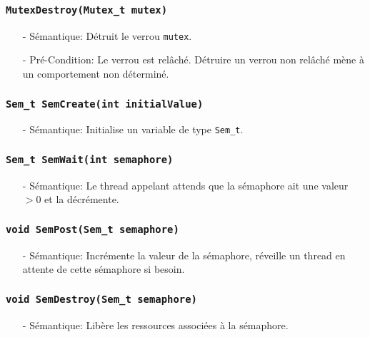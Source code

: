 \documentclass[11pt]{article}
\begin{document}
\subsubsection{\texttt{MutexDestroy(Mutex\_t mutex)}}
\begin{itemize}
\item[-]Sémantique: Détruit le verrou \texttt{mutex}.
\item[-]Pré-Condition: Le verrou est relâché. Détruire un verrou non relâché mène à un comportement
  non déterminé.
\end{itemize}

\subsubsection{\texttt{Sem\_t SemCreate(int initialValue)}}
\begin{itemize}
\item[-]Sémantique: Initialise un variable de type \texttt{Sem\_t}. 
\end{itemize}

\subsubsection{\texttt{Sem\_t SemWait(int semaphore)}}
\begin{itemize}
\item[-]Sémantique: Le thread appelant attends que la sémaphore ait une valeur $>0$ et la décrémente. 
\end{itemize}

\subsubsection{\texttt{void SemPost(Sem\_t semaphore)}}
\begin{itemize}
\item[-]Sémantique: Incrémente la valeur de la sémaphore, réveille un thread en attente de cette sémaphore
  si besoin.
\end{itemize}

\subsubsection{\texttt{void SemDestroy(Sem\_t semaphore)}}
\begin{itemize}
\item[-]Sémantique: Libère les ressources associées à la sémaphore. 
\end{itemize}
\end{document}
